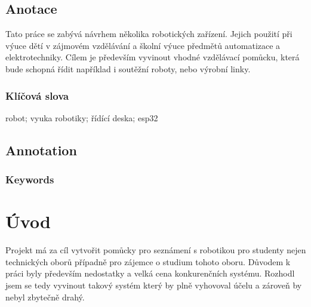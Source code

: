 \documentclass{template/socthesis}
\author{Tomas Vavrinec}
\begin{document}
\maketitle



\pagestyle{empty}

\section*{Anotace}
Tato práce se zabývá návrhem několika robotických zařízení. Jejich použití při výuce dětí v zájmovém vzdělávání a školní výuce předmětů automatizace a elektrotechniky.
Cílem je především vyvinout vhodné vzdělávací pomůcku, která bude schopná řídit například i soutěžní roboty, nebo výrobní linky.


\subsection*{Klíčová slova}
robot; vyuka robotiky; řídící deska; esp32

\vspace{20mm}

\section*{Annotation}


\subsection*{Keywords}

\newpage
\pagestyle{plain}

\tableofcontents %

\setcounter{figure}{0}
\setcounter{table}{0}
\newpage

\chapter*{Úvod}
Projekt má za cíl vytvořit pomůcky pro seznámení s robotikou pro studenty nejen technických oborů případně pro zájemce o studium tohoto oboru. Důvodem k práci byly především nedostatky a velká cena konkurenčních systému. Rozhodl jsem se tedy vyvinout takový systém který by plně vyhovoval účelu a zároveň by nebyl zbytečně drahý.
\end{document}
